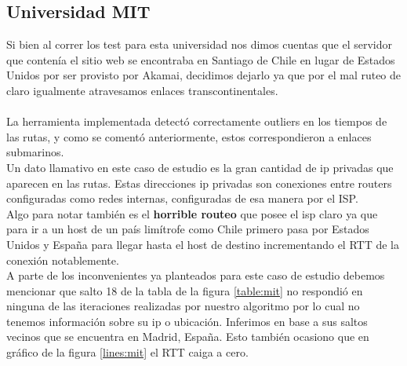 \subsection{Universidad MIT}
Si bien al correr los test para esta universidad nos dimos cuentas que el servidor que contenía el sitio web se encontraba en Santiago de Chile en lugar de Estados Unidos por ser provisto por Akamai, decidimos dejarlo ya que por el mal ruteo de claro igualmente atravesamos enlaces transcontinentales.\\\\
La herramienta implementada detectó correctamente outliers en los tiempos de las rutas, y como se comentó anteriormente, estos correspondieron a enlaces submarinos.\\ 
Un dato llamativo en este caso de estudio es la gran cantidad de ip privadas que aparecen en las rutas. Estas direcciones ip privadas son conexiones entre routers configuradas como redes internas, configuradas de esa manera por el ISP.\\
Algo para notar también es el \textbf{horrible routeo} que posee el isp claro ya que para ir a un host de un país limítrofe como Chile primero pasa por Estados Unidos y España para llegar hasta el host de destino incrementando el RTT de la conexión notablemente.\\
A parte de los inconvenientes ya planteados para este caso de estudio debemos mencionar que salto 18 de la tabla de la figura \ref{table:mit} no respondió en ninguna de las iteraciones realizadas por nuestro algoritmo por lo cual no tenemos información sobre su ip o ubicación. Inferimos en base a sus saltos vecinos que se encuentra en Madrid, España. Esto también ocasiono que en gráfico de la figura \ref{lines:mit} el RTT caiga a cero.

